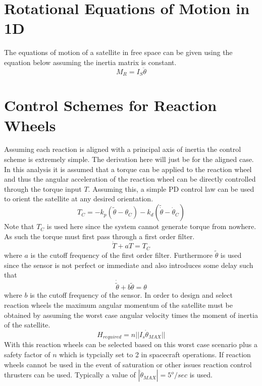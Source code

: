\documentclass{article}
\begin{document}
\section{Rotational Equations of Motion in 1D}

The equations of motion of a satellite in free space can be given
using the equation below assuming the inertia matrix is constant. 
\begin{equation}
M_R = I_S\ddot{\theta}
\end{equation}

\section{Control Schemes for Reaction Wheels}

Assuming each reaction is aligned with a principal axis of inertia the
control scheme is extremely simple. The derivation here will just be
for the aligned case. In this analysis it is assumed that a torque can
be applied to the reaction wheel and thus the angular acceleration of the
reaction wheel can be directly controlled through the torque input
$T$. Assuming this, a simple PD 
control law can be used to orient the satellite at any desired
orientation. 
\begin{equation}
  T_C = -k_p(\tilde{\theta}-\theta_{C})-k_d(\tilde{\dot{\theta}}-\dot{\theta}_{C})
\end{equation}
Note that $T_C$ is used here since the system cannot
generate torque from nowhere. As such the torque must first pass
through a first order filter.
\begin{equation}
  \dot{T} + a T = T_C
\end{equation}
where $a$ is the cutoff frequency of the first order
filter. Furthermore $\tilde{\theta}$ is used since the sensor is not
perfect or immediate and also introduces some delay such that
\begin{equation}
  \dot{\tilde{\theta}} + b \tilde{\theta} = \theta
\end{equation}
where $b$ is the cutoff frequency of the sensor. In order
to design and select reaction wheels the maximum angular 
momentum of the satellite must be obtained by assuming the worst case angular
velocity times the moment of inertia of the satellite.
\begin{equation}
  H_{required} = n||I_s\dot{\theta}_{MAX}||
\end{equation}
With this reaction wheels can be selected based on this worst case
scenario plus a safety factor of $n$ which is typcially set to 2 in
spacecraft operations. If reaction wheels cannot be used in the event
of saturation or other issues reaction control thrusters can be
used. Typically a value of $|\dot{\theta}_{MAX}|=5^o/sec$ is
used. 
\end{document}
